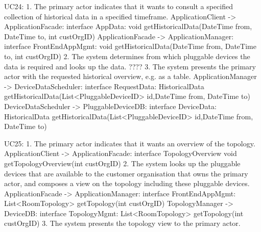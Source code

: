         UC24:
            1. The primary actor indicates that it wants to consult a specified collection of historical data in
                a specified timeframe.
                ApplicationClient -> ApplicationFacade: interface AppData:
                                                void getHistoricalData(DateTime from, DateTime to, int custOrgID)
                ApplicationFacade -> ApplicationManager: interface FrontEndAppMgmt:
                                                void getHistoricalData(DateTime from, DateTime to, int custOrgID)
            2. The system determines from which pluggable devices the data is required and looks up the data.
                 ????
            3. The system presents the primary actor with the requested historical overview, e.g. as a table.
                ApplicationManager -> DeviceDataScheduler: interface RequestData:
                                      HistoricalData getHistoricalData(List<PluggableDeviceID> id,DateTime from, DateTime to)
                DeviceDataScheduler -> PluggableDeviceDB: interface DeviceData:
                                      HistoricalData getHistoricalData(List<PluggableDeviceID> id,DateTime from, DateTime to)

        UC25:
            1. The primary actor indicates that it wants an overview of the topology.
                ApplicationClient -> ApplicationFacade: interface TopologyOverview
                                                               void getTopologyOverview(int custOrgID)
            2. The system looks up the pluggable devices that are available to the customer organisation
           that owns the primary actor, and composes a view on the topology including these pluggable devices.
                ApplicationFacade -> ApplicationManager: interface FrontEndAppMgmt: List<RoomTopology> getTopology(int custOrgID)
                TopologyManager -> DeviceDB: interface TopologyMgmt: List<RoomTopology> getTopology(int custOrgID)
            3. The system presents the topology view to the primary actor.

